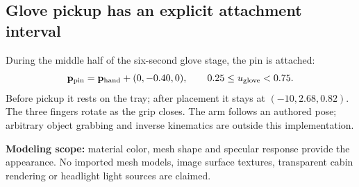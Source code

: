 \documentclass[a4paper,10pt]{article}
\numberwithin{equation}{section}
\begin{document}
\subsection*{Glove pickup has an explicit attachment interval}
During the middle half of the six-second glove stage, the pin is attached:
\begin{equation}
\mathbf p_{\rm pin}=\mathbf p_{\rm hand}+(0,-0.40,0),\qquad 0.25\le u_{\rm glove}<0.75.
\end{equation}
Before pickup it rests on the tray; after placement it stays at $(-10,2.68,0.82)$. The three fingers rotate as the grip closes. The arm follows an authored pose; arbitrary object grabbing and inverse kinematics are outside this implementation.
\begin{notebox}
\textbf{Modeling scope:} material color, mesh shape and specular response provide the appearance. No imported mesh models, image surface textures, transparent cabin rendering or headlight light sources are claimed.
\end{notebox}
\end{document}
